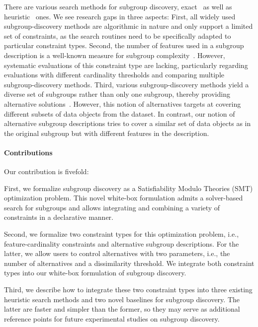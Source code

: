 \documentclass{article}
\theoremstyle{definition}
\begin{document}
There are various search methods for subgroup discovery, exact~\cite{atzmueller2006sd, bosc2018anytime, grosskreutz2009subgroup, lemmerich2010fast} as well as heuristic~\cite{friedman1999bump, leeuwen2012diverse, mampaey2012efficient, proencca2022robust} ones.
We see research gaps in three aspects:
First, all widely used subgroup-discovery methods are algorithmic in nature and only support a limited set of constraints, as the search routines need to be specifically adapted to particular constraint types.
Second, the number of features used in a subgroup description is a well-known measure for subgroup complexity~\cite{helal2016subgroup, herrera2011overview, ventura2018subgroup}.
However, systematic evaluations of this constraint type are lacking, particularly regarding evaluations with different cardinality thresholds and comparing multiple subgroup-discovery methods.
Third, various subgroup-discovery methods yield a diverse set of subgroups rather than only one subgroup, thereby providing alternative solutions~\cite{belfodil2019fssd, bosc2018anytime, leeuwen2012diverse, lemmerich2010fast, lucas2018ssdp+, proencca2022robust}.
However, this notion of alternatives targets at covering different subsets of data objects from the dataset.
In contrast, our notion of alternative subgroup descriptions tries to cover a similar set of data objects as in the original subgroup but with different features in the description.

\paragraph{Contributions}

Our contribution is fivefold:

First, we formalize subgroup discovery as a Satisfiability Modulo Theories (SMT) optimization problem.
This novel white-box formulation admits a solver-based search for subgroups and allows integrating and combining a variety of constraints in a declarative manner.

Second, we formalize two constraint types for this optimization problem, i.e., feature-cardinality constraints and alternative subgroup descriptions.
For the latter, we allow users to control alternatives with two parameters, i.e., the number of alternatives and a dissimilarity threshold.
We integrate both constraint types into our white-box formulation of subgroup discovery.

Third, we describe how to integrate these two constraint types into three existing heuristic search methods and two novel baselines for subgroup discovery.
The latter are faster and simpler than the former, so they may serve as additional reference points for future experimental studies on subgroup discovery.
\end{document}
